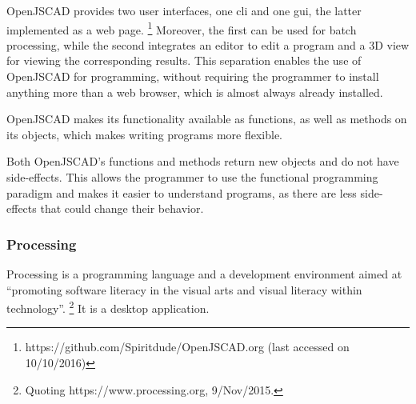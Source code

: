 
OpenJSCAD provides two user interfaces, one \acrfull{cli} and one \acrfull{gui}, the latter implemented as a web page.%
\footnote{https://github.com/Spiritdude/OpenJSCAD.org (last accessed on 10/10/2016)}
Moreover, the first can be used for batch processing, while the second integrates an editor to edit a program and a 3D view for viewing the corresponding results.
This separation enables the use of OpenJSCAD for programming, without requiring the programmer to install anything more than a web browser, which is almost always already installed.

OpenJSCAD makes its functionality available as functions, as well as methods on its objects, which makes writing programs more flexible.

Both OpenJSCAD's functions and methods return new objects and do not have side-effects.
This allows the programmer to use the functional programming paradigm and makes it easier to understand programs, as there are less side-effects that could change their behavior.



\subsubsection{Processing}
\label{section:processing:related}
Processing\cite{reas2007processing} is a programming language and a development environment aimed at ``promoting software literacy in the visual arts and visual literacy within technology''.%
\footnote{Quoting https://www.processing.org, 9/Nov/2015.}
It is a desktop application.

